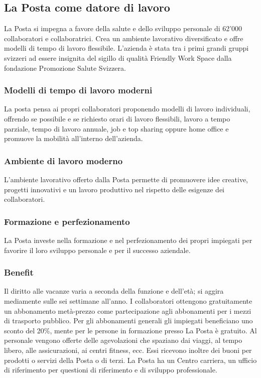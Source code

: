 \subsection{La Posta come datore di lavoro}
La Posta si impegna a favore della salute e dello sviluppo personale di 62'000 collaboratori e collaboratrici. Crea un ambiente lavorativo diversificato e offre modelli di tempo di lavoro flessibile. L’azienda è stata tra i primi grandi gruppi svizzeri ad essere insignita del sigillo di qualità Friendly Work Space dalla fondazione Promozione Salute Svizzera.
\subsubsection{Modelli di tempo di lavoro moderni}
La posta pensa ai propri collaboratori proponendo modelli di lavoro individuali, offrendo se possibile e se richiesto orari di lavoro flessibili, lavoro a tempo parziale, tempo di lavoro annuale, job e top sharing oppure home office e promuove la mobilità all’interno dell’azienda.
\subsubsection{Ambiente di lavoro moderno}
L’ambiente lavorativo offerto dalla Posta permette di promuovere idee creative, progetti innovativi e un lavoro produttivo nel rispetto delle esigenze dei collaboratori.
\subsubsection{Formazione e perfezionamento}
La Posta investe nella formazione e nel perfezionamento dei propri impiegati per favorire il loro sviluppo personale e per il successo aziendale.
\subsubsection{Benefit}
Il diritto alle vacanze varia a seconda della funzione e dell’età; si aggira mediamente sulle sei settimane all’anno.
I collaboratori ottengono gratuitamente un abbonamento metà-prezzo come partecipazione agli abbonamenti per i mezzi di trasporto pubblico. Per gli abbonamenti generali gli impiegati beneficiano uno sconto del 20\%, mente per le persone in formazione presso La Posta è gratuito.
Al personale vengono offerte delle agevolazioni che spaziano dai viaggi, al tempo libero, alle assicurazioni, ai centri fitness, ecc. Essi ricevono inoltre dei buoni per prodotti o servizi della Posta o di terzi.
La Posta ha un Centro carriera, un ufficio di riferimento per questioni di riferimento e di sviluppo professionale.

